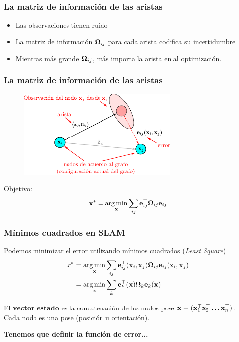 \begin{frame}
    \frametitle{La matriz de información de las aristas}
    \begin{itemize}
        \item Las observaciones tienen ruido
        \item La matriz de información $\boldsymbol{\mathbf{\Omega}}_{ij}$ para cada arista codifica su incertidumbre
        \item Mientras más grande $\boldsymbol{\mathbf{\Omega}}_{ij}$, más importa la arista en al optimización.
    \end{itemize}
    
\end{frame}

\begin{frame}
    \frametitle{La matriz de información de las aristas}
    \begin{figure}[!h]
        \includegraphics[width=0.7\textwidth]{images/factor_graph_edge_example.pdf}
    \end{figure}

    Objetivo:
    \begin{equation*}
        \boldsymbol{\mathbf{x}}^{*} = \operatorname*{arg\,min}_{\boldsymbol{\mathbf{x}}} \sum_{ij} \boldsymbol{\mathbf{e}}^{\top}_{ij} \boldsymbol{\mathbf{\Omega}}_{ij} \boldsymbol{\mathbf{e}}_{ij}
    \end{equation*}
    
\end{frame}



\begin{frame}
    \frametitle{Mínimos cuadrados en SLAM}
    Podemos minimizar el error utilizando mínimos cuadrados (\emph{Least Square})
    \begin{align*}
        x^{*} &= \operatorname*{arg\,min}_{\boldsymbol{\mathbf{x}}} \sum_{ij} \boldsymbol{\mathbf{e}}^{\top}_{ij}(\boldsymbol{\mathbf{x}}_{i},\boldsymbol{\mathbf{x}}_{j}) \boldsymbol{\mathbf{\Omega}}_{ij} \boldsymbol{\mathbf{e}}_{ij}(\boldsymbol{\mathbf{x}}_{i},\boldsymbol{\mathbf{x}}_{j})\\
                 &= \operatorname*{arg\,min}_{\boldsymbol{\mathbf{x}}} \sum_{k} \boldsymbol{\mathbf{e}}^{\top}_{k}(\boldsymbol{\mathbf{x}}) \boldsymbol{\mathbf{\Omega}}_{k} \boldsymbol{\mathbf{e}}_{k}(\boldsymbol{\mathbf{x}})
    \end{align*}
    
    El {\bf vector estado} es la concatenación de los nodos pose $\stateBold = (\stateBold_{1}^{\top} \stateBold_{2}^{\top} \dots \stateBold_{n}^{\top})$. Cada nodo es una pose (posición u orientación).
    
    \vspace{2em}
    {\bf Tenemos que definir la función de error...}
\end{frame}


